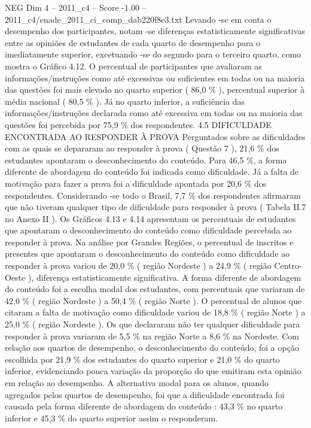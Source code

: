 \begin{textsample}{NEG Dim 4 – 2011\_c4 – Score -1.00 – 2011\_c4/enade\_2011\_ci\_comp\_dab220f8e3.txt}
Levando -se em conta o desempenho dos participantes, notam -se diferenças estatisticamente significativas entre as opiniões de estudantes de cada quarto de desempenho para o imediatamente superior, excetuando -se do segundo para o terceiro quarto, como mostra o Gráfico 4.12.
O percentual de participantes que avaliaram as informações/instruções como até excessivas ou suficientes em todas ou na maioria das questões foi mais elevado no quarto superior ( 86,0 \% ), percentual superior à média nacional ( 80,5 \% ).
Já no quarto inferior, a suficiência das informações/instruções declarada como até excessiva em todas ou na maioria das questões foi percebida por 75,9 \% dos respondentes. 4.5 DIFICULDADE ENCONTRADA AO RESPONDER À PROVA Perguntados sobre as dificuldades com as quais se depararam ao responder à prova ( Questão 7 ), 21,6 \% dos estudantes apontaram o desconhecimento do conteúdo.
Para 46,5 \%, a forma diferente de abordagem do conteúdo foi indicada como dificuldade.
Já a falta de motivação para fazer a prova foi a dificuldade apontada por 20,6 \% dos respondentes.
Considerando -se todo o Brasil, 7,7 \% dos respondentes afirmaram que não tiveram qualquer tipo de dificuldade para responder à prova ( Tabela II.7 no Anexo II ).
Os Gráficos 4.13 e 4.14 apresentam os percentuais de estudantes que apontaram o desconhecimento do conteúdo como dificuldade percebida ao responder à prova.
Na análise por Grandes Regiões, o percentual de inscritos e presentes que apontaram o desconhecimento do conteúdo como dificuldade ao responder à prova variou de 20,0 \% ( região Nordeste ) a 24,9 \% ( região Centro-Oeste ), diferença estatisticamente significativa.
A forma diferente de abordagem do conteúdo foi a escolha modal dos estudantes, com percentuais que variaram de 42,0 \% ( região Nordeste ) a 50,4 \% ( região Norte ).
O percentual de alunos que citaram a falta de motivação como dificuldade variou de 18,8 \% ( região Norte ) a 25,0 \% ( região Nordeste ).
Os que declararam não ter qualquer dificuldade para responder à prova variaram de 5,5 \% na região Norte a 8,6 \% na Nordeste.
Com relação aos quartos de desempenho, o desconhecimento do conteúdo, foi a opção escolhida por 21,9 \% dos estudantes do quarto superior e 21,0 \% do quarto inferior, evidenciando pouca variação da proporção do que emitiram esta opinião em relação ao desempenho.
A alternativa modal para os alunos, quando agregados pelos quartos de desempenho, foi que a dificuldade encontrada foi causada pela forma diferente de abordagem do conteúdo : 43,3 \% no quarto inferior e 45,3 \% do quarto superior assim o responderam.

\end{textsample}
